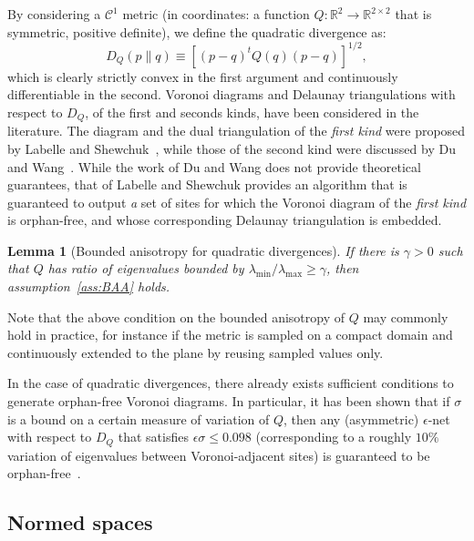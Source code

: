 \documentclass[11pt]{article}
\newtheorem{lemma}{Lemma}
\begin{document}
By considering a $\mathcal{C}^1$ metric 
	(in coordinates: a function $Q:\mathbb{R}^2\rightarrow\mathbb{R}^{2\times 2}$ that is symmetric, positive definite), 
	we define the quadratic divergence as:
\begin{equation}\label{eq:defDQ} 
	D_Q(p \parallel q) \equiv \left[ (p-q)^t Q(q) (p-q) \right]^{1/2}, 
\end{equation}
which is clearly strictly convex in the first argument and continuously differentiable in the second. 
Voronoi diagrams and Delaunay triangulations with respect to $D_Q$, of the first and seconds kinds, have been considered in the literature. 
The diagram and the dual triangulation of the \emph{first kind} were proposed by Labelle and Shewchuk~\cite{LS}, 
	while those of the second kind were discussed by Du and Wang~\cite{DW}. 
While the work of Du and Wang does not provide theoretical guarantees, 
	that of Labelle and Shewchuk provides an algorithm that is guaranteed to output \emph{a} set of sites for which the 
	Voronoi diagram of the \emph{first kind} is orphan-free, and whose corresponding Delaunay triangulation is embedded. 







\begin{lemma}[Bounded anisotropy for quadratic divergences]\label{lem:DQgamma}
If there is $\gamma > 0$ such that $Q$ has ratio of eigenvalues bounded by $\lambda_{\text{min}}/\lambda_{\text{max}}\ge \gamma$,
	then assumption~\ref{ass:BAA} holds. 
\end{lemma}

Note that the above condition on the bounded anisotropy of $Q$ may commonly hold in practice, 
for instance if the metric is sampled on a compact domain and continuously extended to the plane by reusing sampled values only. 

In the case of quadratic divergences, there already exists sufficient conditions to generate orphan-free Voronoi diagrams. 
In particular, it has been shown that if $\sigma$ is a bound on a certain measure of variation of $Q$, 
	then any (asymmetric) $\epsilon$-net with respect to $D_Q$ that satisfies $\epsilon\sigma \le 0.098$ 
	(corresponding to a roughly $10\%$ variation of eigenvalues between Voronoi-adjacent sites)
	is guaranteed to be orphan-free~\cite{avd}. 


\subsection{Normed spaces}\label{sec:Lp}
\end{document}
